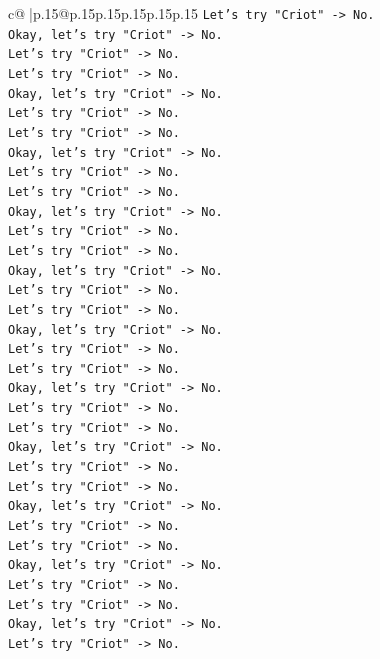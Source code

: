 \documentclass{article}
\begin{document}
{\begin{supertabular}{c@{$\;$}|p{.15\linewidth}@{}p{.15\linewidth}p{.15\linewidth}p{.15\linewidth}p{.15\linewidth}p{.15\linewidth}}
{{{\texttt{Let's try "Criot" {-}> No.} \\
\texttt{Okay, let's try "Criot" {-}> No.} \\
\texttt{Let's try "Criot" {-}> No.} \\
\texttt{Let's try "Criot" {-}> No.} \\
\texttt{Okay, let's try "Criot" {-}> No.} \\
\texttt{Let's try "Criot" {-}> No.} \\
\texttt{Let's try "Criot" {-}> No.} \\
\texttt{Okay, let's try "Criot" {-}> No.} \\
\texttt{Let's try "Criot" {-}> No.} \\
\texttt{Let's try "Criot" {-}> No.} \\
\texttt{Okay, let's try "Criot" {-}> No.} \\
\texttt{Let's try "Criot" {-}> No.} \\
\texttt{Let's try "Criot" {-}> No.} \\
\texttt{Okay, let's try "Criot" {-}> No.} \\
\texttt{Let's try "Criot" {-}> No.} \\
\texttt{Let's try "Criot" {-}> No.} \\
\texttt{Okay, let's try "Criot" {-}> No.} \\
\texttt{Let's try "Criot" {-}> No.} \\
\texttt{Let's try "Criot" {-}> No.} \\
\texttt{Okay, let's try "Criot" {-}> No.} \\
\texttt{Let's try "Criot" {-}> No.} \\
\texttt{Let's try "Criot" {-}> No.} \\
\texttt{Okay, let's try "Criot" {-}> No.} \\
\texttt{Let's try "Criot" {-}> No.} \\
\texttt{Let's try "Criot" {-}> No.} \\
\texttt{Okay, let's try "Criot" {-}> No.} \\
\texttt{Let's try "Criot" {-}> No.} \\
\texttt{Let's try "Criot" {-}> No.} \\
\texttt{Okay, let's try "Criot" {-}> No.} \\
\texttt{Let's try "Criot" {-}> No.} \\
\texttt{Let's try "Criot" {-}> No.} \\
\texttt{Okay, let's try "Criot" {-}> No.} \\
\texttt{Let's try "Criot" {-}> No.} \\
}}}
\end{supertabular}}
\end{document}
